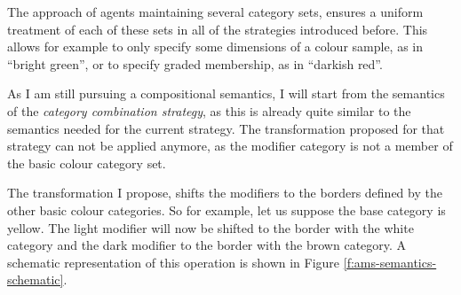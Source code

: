 The approach of agents maintaining several category sets, ensures a
uniform treatment of each of these sets in all of the strategies
introduced before. This allows for example to only specify some
dimensions of a colour sample, as in ``bright green'', or to specify
graded membership, as in ``darkish red''.

As I am still pursuing a compositional semantics, I will start from
the semantics of the \emph{category combination strategy}, as this is
already quite similar to the semantics needed for the current
strategy. The transformation proposed for that strategy can not be
applied anymore, as the modifier category is not a member of the basic
colour category set.

The transformation I propose, shifts the modifiers to the borders
defined by the other basic colour categories. So for example, let us
suppose the base category is yellow. The light modifier will now be
shifted to the border with the white category and the dark modifier to
the border with the brown category. A schematic representation of this
operation is shown in Figure \ref{f:ams-semantics-schematic}.

